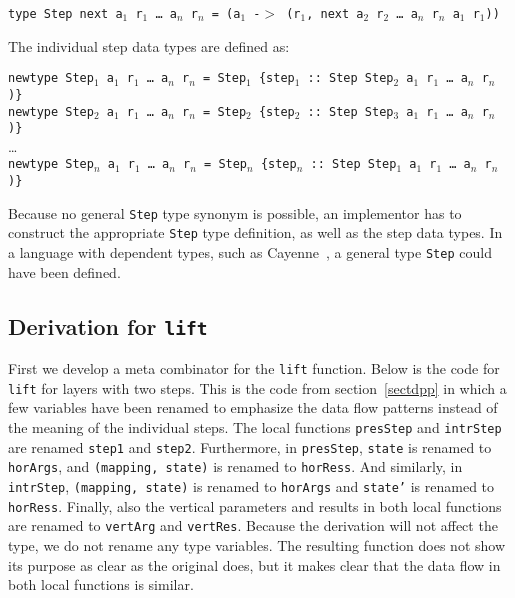 \begin{tabbing}
{\tt type St}\={\tt ep next a$_1$ r$_1$ \dots ~a$_n$ r$_n$ = (a$_1$ -$>$  (r$_1$, next a$_2$ r$_2$ \dots ~a$_n$ r$_n$ a$_1$ r$_1$)) }
\end{tabbing}

The individual step data types are defined as:

{\tt newtype Step$_1$ a$_1$ r$_1$ \dots ~a$_n$ r$_n$ = Step$_1$ \{step$_1$}\verb| :: |{\tt Step Step$_2$ a$_1$ r$_1$ \dots ~a$_n$ r$_n$ )\}}\\
{\tt newtype Step$_2$ a$_1$ r$_1$ \dots ~a$_n$ r$_n$ = Step$_2$ \{step$_2$}\verb| :: |{\tt Step Step$_3$ a$_1$ r$_1$ \dots ~a$_n$ r$_n$ )\}}\\
\dots\\
{\tt newtype Step$_n$ a$_1$ r$_1$ \dots ~a$_n$ r$_n$ = Step$_n$ \{step$_n$}\verb| :: |{\tt Step Step$_1$ a$_1$ r$_1$ \dots ~a$_n$ r$_n$ )\}}

Because no general \texttt{Step} type synonym is possible, an implementor has to construct the appropriate \texttt{Step} type definition, as well as the step data types. In a language with dependent types, such as Cayenne~\cite{cayenne}, a general type \texttt{Step} could have been defined.


%																
\subsection{Derivation for \texttt{lift}}

First we develop a meta combinator for the \texttt{lift} function. Below is the code for \texttt{lift} for layers with two steps. This is the code from section~\ref{sectdpp} in which a few variables have been renamed to emphasize the data flow patterns instead of the meaning of the individual steps. The local functions \texttt{presStep} and \texttt{intrStep} are renamed \texttt{step1} and \texttt{step2}. Furthermore, in \texttt{presStep}, \texttt{state} is renamed to \texttt{horArgs}, and \texttt{(mapping, state)} is renamed to \texttt{horRess}. And similarly, in \texttt{intrStep}, \texttt{(mapping, state)} is renamed to \texttt{horArgs} and \texttt{state'} is renamed to \texttt{horRess}. Finally, also the vertical parameters and results in both local functions are renamed to \texttt{vertArg} and \texttt{vertRes}. Because the derivation will not affect the type, we do not rename any type variables. The resulting function does not show its purpose as clear as the original does, but it makes clear that the data flow in both local functions is similar.

